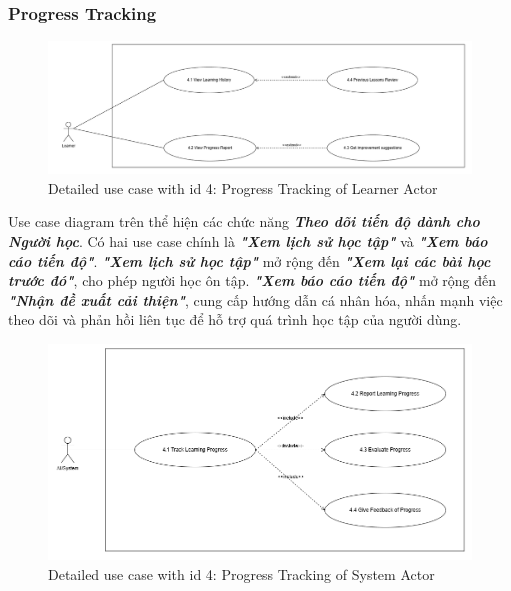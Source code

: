 \subsubsection{Progress Tracking}
\begin{figure}[H]
    \centering
    \includegraphics[scale=0.35]{Images/Usecase/usecase-Progress Tracking - Learner.drawio.png}
    \caption{Detailed use case with id 4: Progress Tracking of Learner Actor}
    \label{fig:enter-label}
\end{figure}
\quad Use case diagram trên thể hiện các chức năng  \textbf{\textit{Theo dõi tiến độ dành cho Người học}}. Có hai use case chính là  \textbf{\textit{"Xem lịch sử học tập"}} và  \textbf{\textit{"Xem báo cáo tiến độ"}}.  \textbf{\textit{"Xem lịch sử học tập"}} mở rộng đến  \textbf{\textit{"Xem lại các bài học trước đó"}}, cho phép người học ôn tập.  \textbf{\textit{"Xem báo cáo tiến độ"}} mở rộng đến  \textbf{\textit{"Nhận đề xuất cải thiện"}}, cung cấp hướng dẫn cá nhân hóa, nhấn mạnh việc theo dõi và phản hồi liên tục để hỗ trợ quá trình học tập của người dùng.
\begin{figure}[H]
    \centering
    \includegraphics[scale=0.4]{Images/Usecase/usecase-Progress Tracking - System.drawio.png}
    \caption{Detailed use case with id 4: Progress Tracking of System Actor}
    \label{fig:enter-label}
\end{figure}
